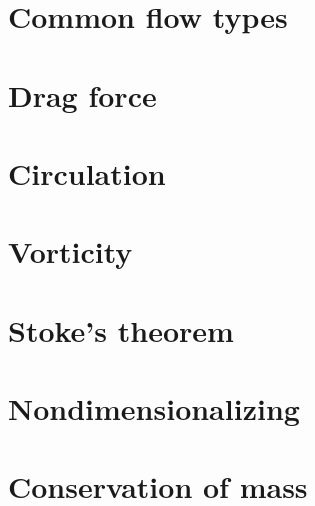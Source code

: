 \documentclass[12pt]{report}
\begin{document}
\chapter{Common flow types}

%

\chapter{Drag force}

%

\chapter{Circulation}

%

\chapter{Vorticity}

%

\chapter{Stoke's theorem}

%

\chapter{Nondimensionalizing}

%

\chapter{Conservation of mass}
\end{document}
